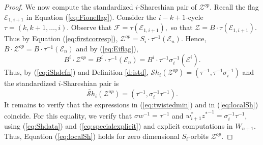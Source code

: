\documentclass[12pt]{amsart}
\numberwithin{equation}{section}
\newcommand{\cZ}{{\mathcal Z}}
\newcommand{\F}{\mathcal{F}}
\newcommand{\Sh}{\mathcal{S}h}
\begin{document}
\begin{proof}
We now compute the standardized $i$-Shareshian pair of ${\cZ}^{op}$.  Recall the flag $\mathcal{E}_{1,i+1}$ in Equation (\ref{eq:Fioneflag}).  Consider the $i-k+1$-cycle $\tau=(k, k+1, \dots, i)$.  Observe that $\F=\tau(\mathcal{E}_{1,i+1}),$
so that $\cZ=B\cdot \tau (\mathcal{E}_{1,i+1}).$  Thus by Equation (\ref{eq:firstcorresp}), ${\cZ}^{op}= S_{i}\cdot\tau^{-1}(\mathcal{E}_{n})$.   Hence, $B\cdot {\cZ}^{op}=B\cdot \tau^{-1}(\mathcal{E}_{n})$ and by (\ref{eq:Eiflag}), 
$$B^{i}\cdot {\cZ}^{op}=B^{i}\cdot \tau^{-1}(\mathcal{E}_{n})=B^{i}\cdot \tau^{-1}\sigma_{i}^{-1}(\mathcal{E}^{i}).$$
Thus, by (\ref{eq:iShdefn}) and Definition \ref{d:istd},
$\Sh_i(\cZ^{op})=(\tau^{-1}, \tau^{-1}\sigma_i^{-1})$ and the standardized $i$-Shareshian pair is  
\begin{equation}\label{eq:twistedmin}
\widetilde{\Sh}_{i}(\cZ^{op})=(\tau^{-1}, \sigma_{i}^{-1}\tau^{-1}).   
\end{equation}
It remains to verify that the expressions in (\ref{eq:twistedmin}) and in (\ref{eq:localSh}) coincide.  For this equality, we verify that 
$\sigma w^{-1} = \tau^{-1}$ and $w_{i+1}^{*}{z^{*}}^{-1}=\sigma_{i}^{-1}\tau^{-1}$,
 using (\ref{eq:Shdata}) and (\ref{eq:specialexplicit}) and explicit computations in $W_{n+1}.$
Thus, Equation (\ref{eq:localSh}) holds for zero dimensional $S_{i}$-orbits ${\cZ}^{op}.$


\end{proof}
\end{document}
